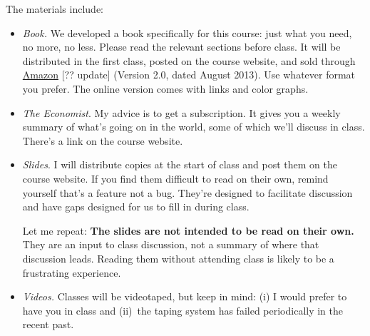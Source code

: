 \documentclass[12pt]{article}
\begin{document}
The materials include:
%
\begin{itemize}
\item {\it Book.\/}
We developed a book specifically for this course:
just what you need, no more, no less.
Please read the relevant sections before class.
It will be distributed in the first class,
posted on the course website,
and sold through
\href{http://www.amazon.com/dp/0615871038/}{Amazon} [?? update]
(Version 2.0, dated August 2013).
Use whatever format you prefer.
The online version comes with links and color graphs.



\item {\it The Economist\/}.
My advice is to get a subscription.
It gives you a weekly summary of what's going on in the world,
some of which we'll discuss in class.
There's a link on the course website.

\item {\it Slides\/}.
I will distribute copies at the start of class and post them on the course website.
If you find them difficult to read on their own,
remind yourself that's a feature not a bug.
They're designed to facilitate discussion
and have gaps designed for us to fill in during class. 

Let me repeat: {\bf The slides are not intended to be read on their own.} 
They are an input to class discussion, not a summary of where that discussion 
leads. 
Reading them without attending class is likely to be a frustrating experience.    

\item {\it Videos.\/}
Classes will be videotaped, but keep in mind:
(i) I would prefer to have you in class and
(ii)~the taping system has failed periodically in the recent past.

\end{itemize}
\end{document}
